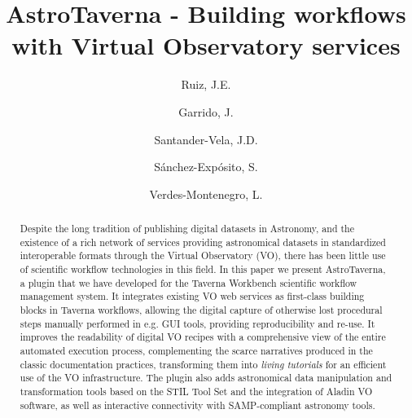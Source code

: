 \documentclass[final,authoryear,5p,times,twocolumn]{elsarticle}
\begin{document}
\begin{frontmatter}



\title{AstroTaverna - Building workflows with Virtual Observatory services}


\author[IAA]{Ruiz, J.E.}

\author[IAA]{Garrido, J.}

\author[IAA]{Santander-Vela, J.D.}
\author[IAA]{S\'anchez-Exp\'osito, S.}
\author[IAA]{Verdes-Montenegro, L.}

\address[IAA]{Instituto de Astrof\'isica de Andaluc\'ia - CSIC \\Glorieta de la Astronom\'ia s/n, 18008 Granada, Spain}


\begin{abstract}
Despite the long tradition of publishing digital datasets in Astronomy, and the existence of a rich network of services providing astronomical datasets in standardized interoperable formats through the Virtual Observatory (VO), there has been little use of scientific workflow technologies in this field. In this paper we present AstroTaverna, a plugin that we have developed for the Taverna Workbench scientific workflow management system. It integrates existing VO web services as first-class building blocks in Taverna workflows, allowing the digital capture of otherwise lost procedural steps manually performed in e.g. GUI tools, providing reproducibility and re-use. It improves the readability of digital VO recipes with a comprehensive view of the entire automated execution process, complementing the scarce narratives produced in the classic documentation practices, transforming them into \textit{living tutorials} for an efficient use of the VO infrastructure. The plugin also adds astronomical data manipulation and transformation tools based on the STIL Tool Set and the integration of Aladin VO software, as well as interactive connectivity with SAMP-compliant astronomy tools. 
\end{abstract}


\end{frontmatter}
\end{document}
